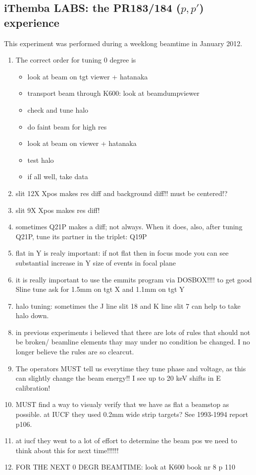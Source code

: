 \documentclass[11pt]{report}
\begin{document}
\subsection{iThemba LABS: the PR183/184 ($p,p'$) experience}

This experiment was performed during a weeklong beamtime in January 2012.

\begin{enumerate}
\item The correct order for tuning 0 degree is
	\begin{itemize}
	\item look at beam on tgt viewer + hatanaka
	\item transport beam through K600: look at beamdumpviewer
	\item check and tune halo
	\item do faint beam for high res
	\item look at beam on viewer + hatanaka
	\item test halo
	\item if all well, take data
	\end{itemize}
\item slit 12X Xpos makes res diff and background diff!! must be centered!?
\item slit 9X Xpos makes res diff!
\item sometimes Q21P makes a diff; not always. When it does, also, after tuning Q21P, tune its partner
	in the triplet: Q19P
\item flat in Y is realy important: if not flat then in focus mode you can see substantial
	increase in Y size of events in focal plane
\item it is really important to use the emmits program via DOSBOX!!!! to get good Sline tune
	ask for 1.5mm on tgt X and 1.1mm on tgt Y
\item halo tuning: sometimes the J line slit 18 and K line slit 7 can help to take halo down.

\item in previous experiments i believed that there are lots of rules that should not be broken/
beamline elements thay may under no condition be changed. I no longer believe the rules are so
clearcut. 

\item The operators MUST tell us everytime they tune phase and voltage, as this can
slightly change the beam energy!! I see up to 20 keV shifts in E calibration!

\item MUST find a way to visualy verify that we have as flat a beamstop as possible.
	at IUCF they used 0.2mm wide strip targets? See 1993-1994 report p106.

\item at iucf they went to a lot of effort to determine the beam pos
	we need to think about this for next time!!!!!!

\item FOR THE NEXT 0 DEGR BEAMTIME: look at K600 book nr 8 p 110
\end{enumerate}
\end{document}
